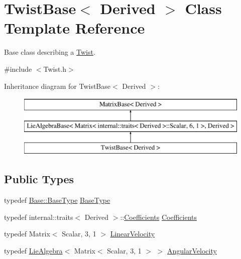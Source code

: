\hypertarget{class_twist_base}{}\section{Twist\+Base$<$ Derived $>$ Class Template Reference}
\label{class_twist_base}


Base class describing a \hyperlink{class_twist}{Twist}.  




{\ttfamily \#include $<$Twist.\+h$>$}

Inheritance diagram for Twist\+Base$<$ Derived $>$\+:\begin{figure}[H]
\begin{center}
\leavevmode
\includegraphics[height=3.000000cm]{class_twist_base}
\end{center}
\end{figure}
\subsection*{Public Types}
\begin{DoxyCompactItemize}
\item 
typedef \hyperlink{class_lie_algebra_base_3_01_matrix_3_01typename_01internal_1_1traits_3_01_derived_01_4_1_1_scala449314c781550590437697c4dc21a6d4_abb811fe29a9ece0ee6f2239f17fea23f}{Base\+::\+Base\+Type} \hyperlink{class_twist_base_a4086aa35326778872a7d0f0bfdfcc0ec}{Base\+Type}
\item 
typedef internal\+::traits$<$ Derived $>$\+::\hyperlink{class_twist_base_a773de67da6fe03840b5178517b17e75c}{Coefficients} \hyperlink{class_twist_base_a773de67da6fe03840b5178517b17e75c}{Coefficients}
\item 
typedef Matrix$<$ Scalar, 3, 1 $>$ \hyperlink{class_twist_base_aeafbc7a3ca37e08812be0af7e680190b}{Linear\+Velocity}
\item 
typedef \hyperlink{class_lie_algebra}{Lie\+Algebra}$<$ Matrix$<$ Scalar, 3, 1 $>$ $>$ \hyperlink{class_twist_base_ad0bc13debe8afc170da877cebe4dc45f}{Angular\+Velocity}
\end{DoxyCompactItemize}
